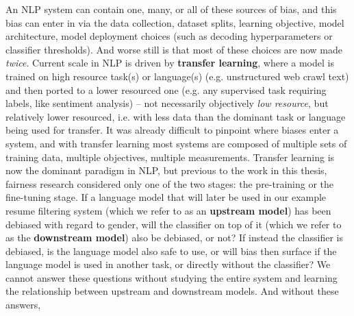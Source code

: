 

An NLP system can contain one, many, or all of these sources of bias, and this bias can enter in via the data collection, dataset splits, learning objective, model architecture, model deployment choices (such as decoding hyperparameters or classifier thresholds). And worse still is that most of these choices are now made \textit{twice}.  Current scale in NLP is driven by \textbf{transfer learning}, where a model is trained on high resource task(s) or language(s) (e.g. unstructured web crawl text) and then ported to a lower resourced one (e.g. any supervised task requiring labels, like sentiment analysis) -- not necessarily objectively \textit{low resource}, but relatively lower resourced, i.e. with less data than the dominant task or language being used for transfer. 
It was already difficult to pinpoint where biases enter a system, and with transfer learning most systems are composed of multiple sets of training data, multiple objectives, multiple measurements. Transfer learning is now the dominant paradigm in NLP, but previous to the work in this thesis, fairness research considered only one of the two stages: the pre-training or the fine-tuning stage. If a language model that will later be used in our example resume filtering system (which we refer to as an \textbf{upstream model}) has been debiased with regard to gender, will the classifier on top of it (which we refer to as the \textbf{downstream model}) also be debiased, or not? If instead the classifier is debiased, is the language model also safe to use, or will bias then surface if the language model is used in another task, or directly without the classifier? We cannot answer these questions without studying the entire system and learning the relationship between upstream and downstream models. And without these answers,
